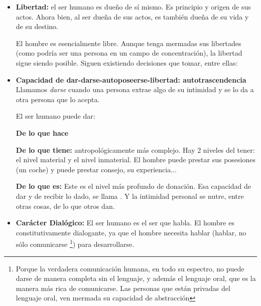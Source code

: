 \documentclass[palatino]{apuntesURJC}
\begin{document}
\begin{itemize}
	\subitem \textbf{Lenguaje:} \footnote{entendiendo lenguaje como lenguaje verbal.}
	A través del lenguaje hago público, comparto con otros aquello que antes estaba dentro de mi.

	El lenguaje tiene mayor capacidad expresiva que el cuerpo y puede permanecer (a través de la escritura sobretodo).

	\subitem \textbf{Acción:}
	Las personas nos damos a conocer con nuestros actos.
	La persona no es sólo sus acciones, pero es aquello que hace. \footnote{No sé si esta afirmación es lógicamente consistente en sí misma.}

	\item \textbf{Libertad:} el ser humano es dueño de sí mismo.
	Es principio y origen de sus actos. Ahora bien, al ser dueña de sus actos, es también dueña de su vida y de su destino.

	\subitem El hombre es esencialmente libre. Aunque tenga mermadas sus libertades (como podría ser una persona en un campo de concentración), la libertad sigue siendo posible.
	Siguen existiendo decisiones que tomar, entre ellas:

	\item \textbf{Capacidad de dar-darse-autoposeerse-libertad: autotrascendencia}
	Llamamos \textit{darse} cuando una persona extrae algo de su intimidad y se lo da a otra persona que lo acepta.

	El ser humano puede dar:

	\subitem \textbf{De lo que hace}

	\subitem \textbf{De lo que tiene:} antropológicamente más complejo. Hay 2 niveles del tener: el nivel material y el nivel inmaterial.
	El hombre puede prestar sus posesiones (un coche) y puede prestar consejo, su experiencia...

	\subitem \textbf{De lo que es:} Este es el nivel más profundo de donación.
	Esa capacidad de dar y de recibir lo dado, se llama .
	Y la intimidad personal se nutre, entre otras cosas, de lo que otros dan.

	\item \textbf{Carácter Dialógico:} El ser humano es el ser que habla.
	El hombre es constitutivamente dialogante, ya que el hombre necesita hablar (hablar, no sólo comunicarse
	\footnote{Porque la verdadera comunicación humana, en todo su espectro, no puede darse de manera completa sin el lenguaje, y además el lenguaje oral, que es la manera más rica de comunicarse.
	Las personas que están privadas del lenguaje oral, ven mermada su capacidad de abstracción})
	para desarrollarse.

\end{itemize}
\end{document}
